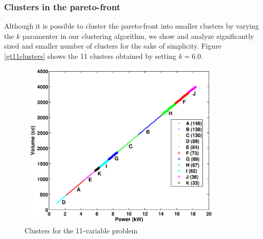 \subsubsection{Clusters in the pareto-front}
Although it is possible to cluster the pareto-front into smaller clusters by varying the 
$k$ paramenter in our clustering algorithm, we show and analyze significantly sized and 
smaller number of clusters for the sake of simplicity. Figure \ref{gt11clusters} shows 
the 11 clusters obtained by setting $k = 6.0$.


\begin{figure}[ht]\begin{center}
 \includegraphics[width=100mm, height=80mm]{dia/gt11cpareto1.eps}
 \caption{Clusters for the 11-variable problem}
 \label{gt11Clusters}
\end{center}\end{figure}






